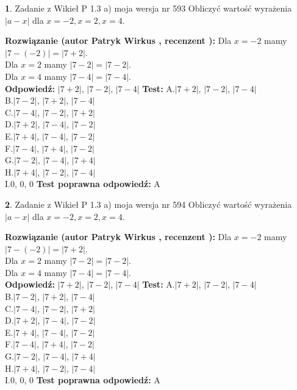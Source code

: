 \documentclass[12pt, a4paper]{article}
\theoremstyle{definition} %
\newtheorem{zad}{}
\newcommand{\zadStart}[1]{\begin{zad}#1\newline}
\newcommand{\zadStop}{\end{zad}}
\newcommand{\rozwStart}[2]{\noindent \textbf{Rozwiązanie (autor #1 , recenzent #2): }\newline}
\newcommand{\rozwStop}{\newline}
\newcommand{\odpStart}{\noindent \textbf{Odpowiedź:}\newline}
\newcommand{\odpStop}{\newline}
\newcommand{\testStart}{\noindent \textbf{Test:}\newline}
\newcommand{\testStop}{\newline}
\newcommand{\kluczStart}{\noindent \textbf{Test poprawna odpowiedź:}\newline}
\newcommand{\kluczStop}{\newline}
\begin{document}
\zadStart{Zadanie z Wikieł P 1.3 a) moja wersja nr 593}
Obliczyć wartość wyrażenia $|a - x|$ dla $x=-2,x=2,x=4$.
\zadStop
\rozwStart{Patryk Wirkus}{}
Dla $x = -2$ mamy $|7 - (-2)| = |7 + 2|$.\\
Dla $x = 2$ mamy $|7 - 2| = |7 - 2|$.\\
Dla $x = 4$ mamy $|7 - 4| = |7 - 4|$.\\
\rozwStop
\odpStart
$|7 + 2|$, $|7 - 2|$, $|7 - 4|$
\odpStop
\testStart
A.$|7 + 2|$, $|7 - 2|$, $|7 - 4|$\\
B.$|7 - 2|$, $|7 + 2|$, $|7 - 4|$\\
C.$|7 - 4|$, $|7 - 2|$, $|7 + 2|$\\
D.$|7 + 2|$, $|7 - 4|$, $|7 - 2|$\\
E.$|7 + 4|$, $|7 - 4|$, $|7 - 2|$\\
F.$|7 - 4|$, $|7 + 4|$, $|7 - 2|$\\
G.$|7 - 2|$, $|7 - 4|$, $|7 + 4|$\\
H.$|7 + 4|$, $|7 - 2|$, $|7 - 4|$\\
I.$0$, $0$, $0$
\testStop
\kluczStart
A
\kluczStop



\zadStart{Zadanie z Wikieł P 1.3 a) moja wersja nr 594}
Obliczyć wartość wyrażenia $|a - x|$ dla $x=-2,x=2,x=4$.
\zadStop
\rozwStart{Patryk Wirkus}{}
Dla $x = -2$ mamy $|7 - (-2)| = |7 + 2|$.\\
Dla $x = 2$ mamy $|7 - 2| = |7 - 2|$.\\
Dla $x = 4$ mamy $|7 - 4| = |7 - 4|$.\\
\rozwStop
\odpStart
$|7 + 2|$, $|7 - 2|$, $|7 - 4|$
\odpStop
\testStart
A.$|7 + 2|$, $|7 - 2|$, $|7 - 4|$\\
B.$|7 - 2|$, $|7 + 2|$, $|7 - 4|$\\
C.$|7 - 4|$, $|7 - 2|$, $|7 + 2|$\\
D.$|7 + 2|$, $|7 - 4|$, $|7 - 2|$\\
E.$|7 + 4|$, $|7 - 4|$, $|7 - 2|$\\
F.$|7 - 4|$, $|7 + 4|$, $|7 - 2|$\\
G.$|7 - 2|$, $|7 - 4|$, $|7 + 4|$\\
H.$|7 + 4|$, $|7 - 2|$, $|7 - 4|$\\
I.$0$, $0$, $0$
\testStop
\kluczStart
A
\kluczStop
\end{document}
